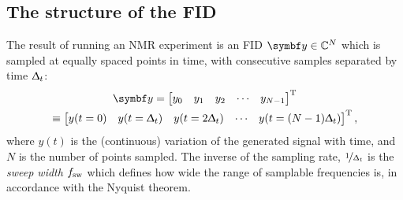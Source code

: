 \subsection{The structure of the \acs{FID}}
The result of running an \ac{NMR} experiment is an \ac{FID} $\by \in
\mathbb{C}^N$ which is sampled at equally spaced points in time, with
consecutive samples separated by time $\Updelta_t$:
\begin{equation}
    \begin{gathered}
        \by = \begin{bmatrix}
            y_0 & y_1 & y_2 & \cdots & y_{N-1}
      \end{bmatrix}\T\\
      \equiv
      \begin{bmatrix}
          y(t=0) & y(t=\Dt) & y(t=2\Dt) & \cdots & y(t=(N-1)\Dt)
      \end{bmatrix}\T,
    \end{gathered}
\end{equation}
where $y(t)$ is the (continuous) variation of the generated signal with time,
and $N$ is the number of points sampled. The inverse of the sampling rate,
$\nicefrac{1}{\Updelta_t}$ is the \emph{sweep width} $f_{\mathrm{sw}}$ which
defines how wide the range of samplable frequencies is, in accordance with the
Nyquist theorem\cite{Shannon1949}.


